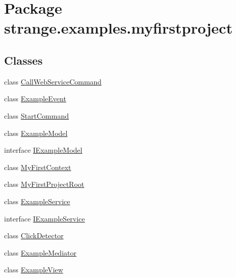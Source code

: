 \hypertarget{namespacestrange_1_1examples_1_1myfirstproject}{\section{Package strange.\-examples.\-myfirstproject}
\label{namespacestrange_1_1examples_1_1myfirstproject}
}
\subsection*{Classes}
\begin{DoxyCompactItemize}
\item 
class \hyperlink{classstrange_1_1examples_1_1myfirstproject_1_1_call_web_service_command}{Call\-Web\-Service\-Command}
\item 
class \hyperlink{classstrange_1_1examples_1_1myfirstproject_1_1_example_event}{Example\-Event}
\item 
class \hyperlink{classstrange_1_1examples_1_1myfirstproject_1_1_start_command}{Start\-Command}
\item 
class \hyperlink{classstrange_1_1examples_1_1myfirstproject_1_1_example_model}{Example\-Model}
\item 
interface \hyperlink{interfacestrange_1_1examples_1_1myfirstproject_1_1_i_example_model}{I\-Example\-Model}
\item 
class \hyperlink{classstrange_1_1examples_1_1myfirstproject_1_1_my_first_context}{My\-First\-Context}
\item 
class \hyperlink{classstrange_1_1examples_1_1myfirstproject_1_1_my_first_project_root}{My\-First\-Project\-Root}
\item 
class \hyperlink{classstrange_1_1examples_1_1myfirstproject_1_1_example_service}{Example\-Service}
\item 
interface \hyperlink{interfacestrange_1_1examples_1_1myfirstproject_1_1_i_example_service}{I\-Example\-Service}
\item 
class \hyperlink{classstrange_1_1examples_1_1myfirstproject_1_1_click_detector}{Click\-Detector}
\item 
class \hyperlink{classstrange_1_1examples_1_1myfirstproject_1_1_example_mediator}{Example\-Mediator}
\item 
class \hyperlink{classstrange_1_1examples_1_1myfirstproject_1_1_example_view}{Example\-View}
\end{DoxyCompactItemize}
